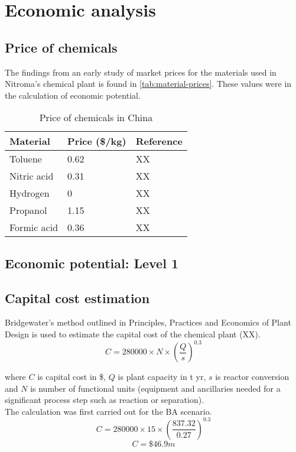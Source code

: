 \section{Economic analysis}
\label{app:economics}
\subsection{Price of chemicals}

The findings from an early study of market prices for the materials used in Nitroma's chemical plant is found in \cref{tab:material-prices}. These values were in the calculation of economic potential.

\begin{table}[]
\begin{tabular}{lll}
    \caption{Price of chemicals in China}
    \label{material-prices}
    \hline
    Material    & Price (\$/kg) & Reference \\ \hline
    Toluene     & 0.62          & XX        \\
    Nitric acid & 0.31          & XX        \\
    Hydrogen    & 0             & XX        \\
    Propanol    & 1.15          & XX        \\
    Formic acid & 0.36          & XX        \\ \hline
\end{tabular}
\end{table}

\subsection{Economic potential: Level 1}

\subsection{Capital cost estimation}

Bridgewater's method outlined in Principles, Practices and Economics of Plant Design is used to estimate the capital cost of the chemical plant (XX).
\begin{equation}
    C=280000 \times N \times (\frac{Q}{s})^0.3
\end{equation}

where $C$ is capital cost in \$, $Q$ is  plant capacity in t yr, $s$ is reactor conversion and $N$ is number of functional units (equipment and ancillaries needed for a significant process step such as reaction or separation).\\
The calculation was first carried out for the BA scenario.
\begin{equation}
    C=280000 \times 15 \times (\frac{837.32}{0.27})^0.3
\end{equation}
\begin{equation}
    C=\$46.9m
\end{equation}
    
